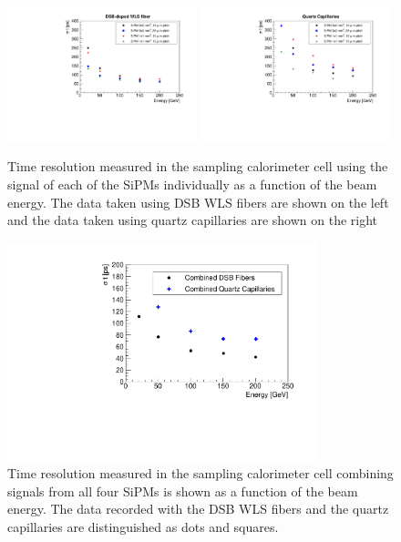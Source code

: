 \begin{figure}[htb]
\centering
\includegraphics[width=0.49\textwidth]{figures/ShashlikTimeResolutionVsEnergy_DSB.pdf}
\includegraphics[width=0.49\textwidth]{figures/ShashlikTimeResolutionVsEnergy_Capillaries.pdf}
\caption{\label{TimeResolutionVsEnergy} Time resolution measured in the sampling calorimeter 
cell using the signal of each of the SiPMs individually as a function of the beam energy. 
The data taken using DSB WLS fibers are shown on
the left and the data taken using quartz capillaries are shown on the right}
\end{figure}



\begin{figure}[htb]
\centering
\includegraphics[width=0.8\textwidth]{figures/ShashlikTimeResolutionCombinedChannelVsEnergy.pdf}
\caption{\label{TimeResolutionCombined}  Time resolution measured in the sampling calorimeter cell combining signals from all four  
SiPMs is shown as a function of the beam energy.  The data recorded with the DSB WLS fibers and the
quartz capillaries are distinguished as dots and squares.}
\end{figure}




